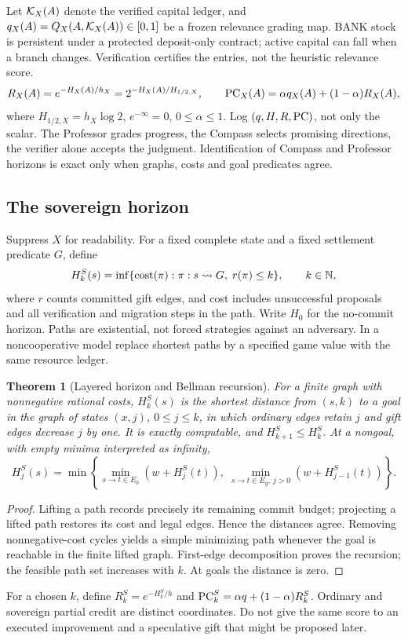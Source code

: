 \documentclass[11pt]{article}
\newtheorem{theorem}{Theorem}[section]\newtheorem{proposition}[theorem]{Proposition}\newtheorem{lemma}[theorem]{Lemma}\newtheorem{corollary}[theorem]{Corollary}
\theoremstyle{definition}\newtheorem{definition}[theorem]{Definition}\newtheorem{conjecture}[theorem]{Conjecture}\newtheorem{example}[theorem]{Example}
\begin{document}
Let $\mathcal K_X(A)$ denote the verified capital ledger, and $q_X(A)=Q_X(A,\mathcal K_X(A))\in[0,1]$ be a frozen relevance grading map. BANK stock is persistent under a protected deposit-only contract; active capital can fall when a branch changes. Verification certifies the entries, not the heuristic relevance score.
\[
 R_X(A)=e^{-H_X(A)/h_X}=2^{-H_X(A)/H_{1/2,X}},\qquad
 \operatorname{PC}_X(A)=\alpha q_X(A)+(1-\alpha)R_X(A),
\]
where $H_{1/2,X}=h_X\log 2$, $e^{-\infty}=0$, $0\le\alpha\le1$. Log $(q,H,R,\operatorname{PC})$, not only the scalar. The Professor grades progress, the Compass selects promising directions, the verifier alone accepts the judgment. Identification of Compass and Professor horizons is exact only when graphs, costs and goal predicates agree.

\subsection{The sovereign horizon}
Suppress $X$ for readability. For a fixed complete state and a fixed settlement predicate $G$, define
\[
 H_k^S(s)=\inf\{\operatorname{cost}(\pi): \pi:s\leadsto G,\;r(\pi)\le k\},\qquad k\in\mathbb N,
\]
where $r$ counts committed gift edges, and cost includes unsuccessful proposals and all verification and migration steps in the path. Write $H_0$ for the no-commit horizon. Paths are existential, not forced strategies against an adversary. In a noncooperative model replace shortest paths by a specified game value with the same resource ledger.
\begin{theorem}[Layered horizon and Bellman recursion]
For a finite graph with nonnegative rational costs, $H_k^S(s)$ is the shortest distance from $(s,k)$ to a goal in the graph of states $(x,j)$, $0\le j\le k$, in which ordinary edges retain $j$ and gift edges decrease $j$ by one. It is exactly computable, and $H_{k+1}^S\le H_k^S$. At a nongoal, with empty minima interpreted as infinity,
\[
 H_j^S(s)=\min\left\{\min_{s\to t\in E_0}(w+H_j^S(t)),\;\min_{s\to t\in E_g,\ j>0}(w+H_{j-1}^S(t))\right\}.
\]
\end{theorem}
\begin{proof}Lifting a path records precisely its remaining commit budget; projecting a lifted path restores its cost and legal edges. Hence the distances agree. Removing nonnegative-cost cycles yields a simple minimizing path whenever the goal is reachable in the finite lifted graph. First-edge decomposition proves the recursion; the feasible path set increases with $k$. At goals the distance is zero.\end{proof}
For a chosen $k$, define $R_k^S=e^{-H_k^S/h}$ and $\operatorname{PC}_k^S=\alpha q+(1-\alpha)R_k^S$. Ordinary and sovereign partial credit are distinct coordinates. Do not give the same score to an executed improvement and a speculative gift that might be proposed later.
\end{document}
